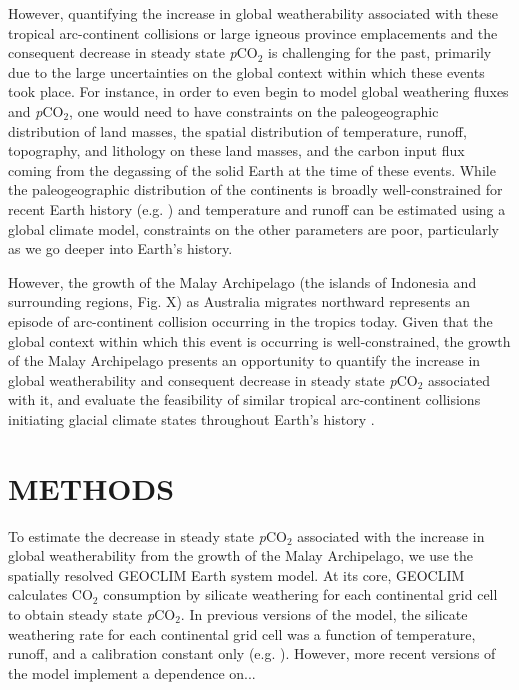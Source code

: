 \documentclass[11pt,letterpaper]{article}
\newcommand{\pCOtwo}{\textit{p}CO$_{2}$\xspace}
\newcommand{\COtwo}{CO$_{2}$\xspace}
\begin{document}
However, quantifying the increase in global weatherability associated with these tropical arc-continent collisions or large igneous province emplacements and the consequent decrease in steady state \pCOtwo is challenging for the past, primarily due to the large uncertainties on the global context within which these events took place. For instance, in order to even begin to model global weathering fluxes and \pCOtwo, one would need to have constraints on the paleogeographic distribution of land masses, the spatial distribution of temperature, runoff, topography, and lithology on these land masses, and the carbon input flux coming from the degassing of the solid Earth at the time of these events. While the paleogeographic distribution of the continents is broadly well-constrained for recent Earth history (e.g. \citealp{Torsvik2016a}) and temperature and runoff can be estimated using a global climate model, constraints on the other parameters are poor, particularly as we go deeper into Earth's history.

However, the growth of the Malay Archipelago (the islands of Indonesia and surrounding regions, Fig. X) as Australia migrates northward represents an episode of arc-continent collision occurring in the tropics today. Given that the global context within which this event is occurring is well-constrained, the growth of the Malay Archipelago presents an opportunity to quantify the increase in global weatherability and consequent decrease in steady state \pCOtwo associated with it, and evaluate the feasibility of similar tropical arc-continent collisions initiating glacial climate states throughout Earth's history \citep{Macdonald2019a}.

\section*{METHODS}

To estimate the decrease in steady state \pCOtwo associated with the increase in global weatherability from the growth of the Malay Archipelago, we use the spatially resolved GEOCLIM Earth system model. At its core, GEOCLIM calculates \COtwo consumption by silicate weathering for each continental grid cell to obtain steady state \pCOtwo. In previous versions of the model, the silicate weathering rate for each continental grid cell was a function of temperature, runoff, and a calibration constant only (e.g. \citealp{Godderis2014a}). However, more recent versions of the model implement a dependence on...
\end{document}
